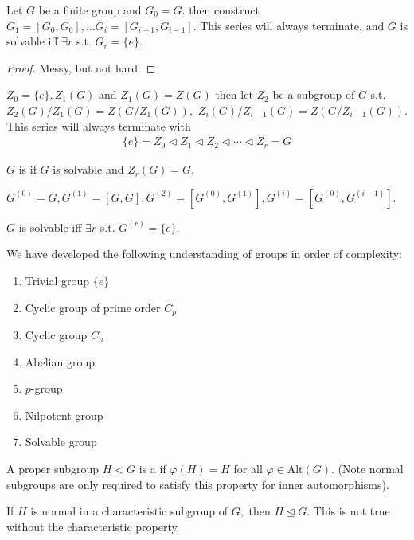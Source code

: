 \documentclass[a4paper]{article}
\begin{document}
\begin{theorem}
    Let $G$ be a finite group and $G_0=G.$ then construct $G_1=[G_0,G_0],\dots G_i=[G_{i-1},G_{i-1}].$  This series will always terminate, and $G$ is solvable iff $\exists r$ s.t. $G_r=\{e\}.$ \begin{proof}
        Messy, but not hard.
    \end{proof}
\end{theorem}
\begin{definition}
    $Z_0=\{e\},Z_1(G)$ and $Z_1(G)=Z(G)$ then let $Z_2$ be a subgroup of $G$ s.t. $Z_2(G)/Z_1(G)=Z(G/Z_1(G)),$ $Z_i(G)/Z_{i-1}(G)=Z(G/Z_{i-1}(G)).$ This series will always terminate with \begin{align}
        \{e\}=Z_0\triangleleft Z_1\triangleleft Z_2\triangleleft\cdots\triangleleft Z_r=G
    \end{align}
\end{definition}
\begin{definition}[Nilpotent]
    $G$ is  if $G$ is solvable and $Z_r(G)=G.$
\end{definition}
\begin{definition}
    $G^{(0)}=G,G^{(1)}=[G,G],G^{(2)}=[G^{(0)},G^{(1)}],G^{(i)}=[G^{(0)},G^{(i-1)}].$   
\end{definition}
\begin{theorem}
    $G$ is solvable iff $\exists r$ s.t. $G^{(r)}=\{e\}.$
\end{theorem}

We have developed the following understanding of groups in order of complexity: \begin{enumerate}
    \item Trivial group $\{e\}$
    \item Cyclic group of prime order $C_p$
    \item Cyclic group $C_n$
    \item Abelian group
    \item $p$-group
    \item Nilpotent group
    \item Solvable group
\end{enumerate}

\begin{definition}[Characteristic]
    A proper subgroup $H<G$ is a  if $\varphi(H)=H$ for all $\varphi\in\mathrm{Alt}(G).$ (Note normal subgroups are only required to satisfy this property for inner automorphisms).
\end{definition}
\begin{proposition}
    If $H$ is normal in a characteristic subgroup of $G,$ then $H\trianglelefteq G.$ This is not true without the characteristic property.
\end{proposition}
\end{document}
